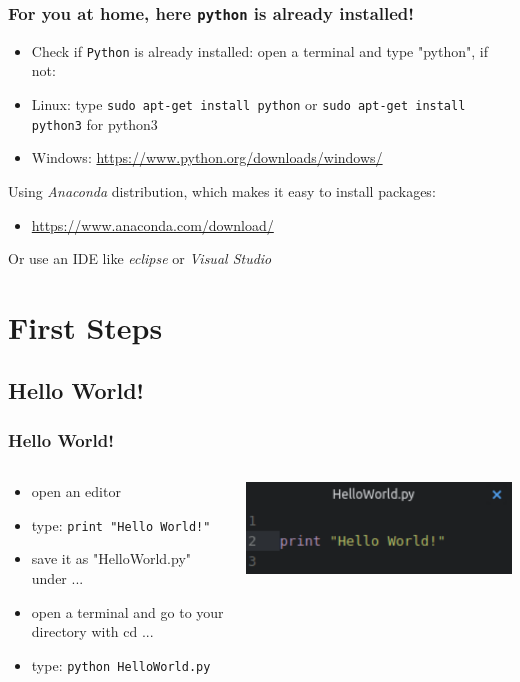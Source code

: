 \documentclass{beamer}
\begin{document}
\begin{frame}
\frametitle{For you at home, here \texttt{python} is already installed!}
	\begin{itemize}
		\item Check if \texttt{Python} is already installed: open a terminal and type "python", if not:
		\item Linux: type \texttt{sudo apt-get install python} or \texttt{sudo apt-get install python3} for python3
		\item Windows: \url{https://www.python.org/downloads/windows/}
	\end{itemize}
	Using \textit{Anaconda} distribution, which makes it easy to install packages:
	\begin{itemize}
		\item \url{https://www.anaconda.com/download/}
	\end{itemize}
	Or use an IDE like \textit{eclipse} or \textit{Visual Studio}
\end{frame}

\section{First Steps}
\subsection{Hello World!}

\begin{frame}
\frametitle{ Hello World!}
	\begin{columns}[T]
		\begin{column}[T]{7cm}
			\begin{itemize}
				\item open an editor 
				\item type: \texttt{print "Hello World!"}
				\item save it as "HelloWorld.py" under ...
				\item open a terminal and go to your directory with cd ...
				\item type: \texttt{python HelloWorld.py}
			\end{itemize}
		\end{column}
		\begin{column}[T]{5cm}
			\includegraphics[width = 1\textwidth]{HelloWorld.pdf}
		\end{column}
	\end{columns}
\end{frame}
\end{document}
